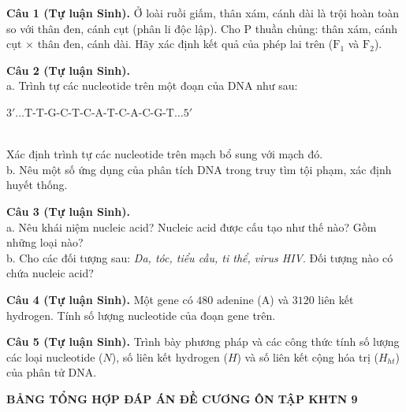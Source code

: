 \documentclass{article}
\begin{document}
\fontsize{25}{33}\selectfont
\textbf{Câu 1 (Tự luận Sinh).} Ở loài ruồi giấm, thân xám, cánh dài là trội hoàn toàn so với thân đen, cánh cụt (phân li độc lập). Cho P thuần chủng: thân xám, cánh cụt $\times$ thân đen, cánh dài. Hãy xác định kết quả của phép lai trên ($\text{F}_1$ và $\text{F}_2$).
\vspace*{\fill}
\newpage

\fontsize{24}{32}\selectfont
\textbf{Câu 2 (Tự luận Sinh).}\\
a. Trình tự các nucleotide trên một đoạn của DNA như sau:\\
\centerline{$3' \dots \text{T-T-G-C-T-C-A-T-C-A-C-G-T} \dots 5'$}\\
Xác định trình tự các nucleotide trên mạch bổ sung với mạch đó.\\
b. Nêu một số ứng dụng của phân tích DNA trong truy tìm tội phạm, xác định huyết thống.
\vspace*{\fill}
\newpage

\fontsize{24}{32}\selectfont
\textbf{Câu 3 (Tự luận Sinh).}\\
a. Nêu khái niệm nucleic acid? Nucleic acid được cấu tạo như thế nào? Gồm những loại nào?\\
b. Cho các đối tượng sau: \textit{Da, tóc, tiểu cầu, ti thể, virus HIV}. Đối tượng nào có chứa nucleic acid?
\vspace*{\fill}
\newpage

\fontsize{26}{34}\selectfont
\textbf{Câu 4 (Tự luận Sinh).} Một gene có $480\text{ adenine}$ ($\text{A}$) và $3120$ liên kết hydrogen. Tính số lượng nucleotide của đoạn gene trên.
\vspace*{\fill}
\newpage

\fontsize{25}{33}\selectfont
\textbf{Câu 5 (Tự luận Sinh).} Trình bày phương pháp và các công thức tính số lượng các loại nucleotide ($N$), số liên kết hydrogen ($H$) và số liên kết cộng hóa trị ($H_{ht}$) của phân tử DNA.
\vspace*{\fill}
\newpage

\begin{center}
{\fontsize{24}{30}\selectfont \textbf{\color{brandGreen}BẢNG TỔNG HỢP ĐÁP ÁN ĐỀ CƯƠNG ÔN TẬP KHTN 9}}\\[0.4cm]
\end{center}
\end{document}
